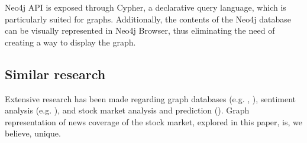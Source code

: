 Neo4j API is exposed through Cypher, a declarative query language, which is particularly suited for graphs.
Additionally, the contents of the Neo4j database can be visually represented in Neo4j Browser, thus eliminating the need of creating a way to display the graph.


\subsection{Similar research}
Extensive research has been made regarding graph databases (e.g. \cite{Arxiv-1-Represent-2211161017:online}, \cite{Arxiv-2-Enter-2108028697:online}), sentiment analysis (e.g. \cite{Anovelen10:online}), and stock market analysis and prediction (\cite{Arxiv-4-Trend-Prediction-1903054480:online}).
Graph representation of news coverage of the stock market, explored in this paper, is, we believe, unique.
